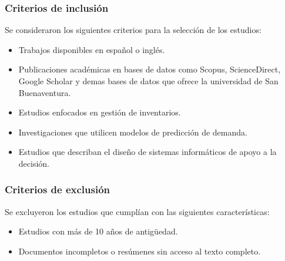 \subsubsection{Criterios de inclusión}

Se consideraron los siguientes criterios para la selección de los estudios:

\begin{itemize}
    \item Trabajos disponibles en español o inglés.
    \item Publicaciones académicas en bases de datos como Scopus, ScienceDirect, Google Scholar y demas bases de datos que ofrece la universidad de San Buenaventura.
    \item Estudios enfocados en gestión de inventarios.
    \item Investigaciones que utilicen modelos de predicción de demanda.
    \item Estudios que describan el diseño de sistemas informáticos de apoyo a la decisión.
\end{itemize}

\subsubsection{Criterios de exclusión}

Se excluyeron los estudios que cumplían con las siguientes características:

\begin{itemize}
    \item Estudios con más de 10 años de antigüedad.
    \item Documentos incompletos o resúmenes sin acceso al texto completo.
\end{itemize}
